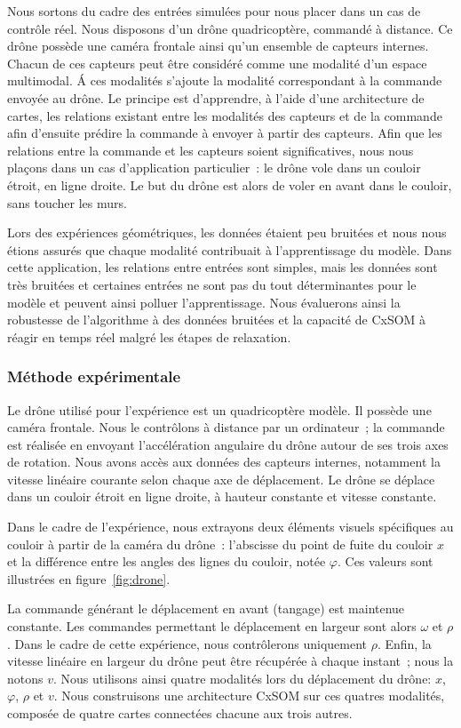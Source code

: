 \documentclass[../main]{subfiles}
\begin{document}
Nous sortons du cadre des entrées simulées pour nous placer dans un cas de contrôle réel.
Nous disposons d'un drône quadricoptère, commandé à distance. 
Ce drône possède une caméra frontale ainsi qu'un ensemble de capteurs internes. Chacun de ces capteurs peut être considéré comme une modalité d'un espace multimodal. \'A ces modalités s'ajoute la modalité correspondant à la commande envoyée au drône.
Le principe est d'apprendre, à l'aide d'une architecture de cartes, les relations existant entre les modalités des capteurs et de la commande afin d'ensuite prédire la commande à envoyer à partir des capteurs.
Afin que les relations entre la commande et les capteurs soient significatives, nous nous plaçons dans un cas d'application particulier~: le drône vole dans un couloir étroit, en ligne droite. Le but du drône est alors de voler en avant dans le couloir, sans toucher les murs.


Lors des expériences géométriques, les données étaient peu bruitées et nous nous étions assurés que chaque modalité contribuait à l'apprentissage du modèle. Dans cette application, les relations entre entrées sont simples, mais les données sont très bruitées et certaines entrées ne sont pas du tout déterminantes pour le modèle et peuvent ainsi polluer l'apprentissage.
Nous évaluerons ainsi la robustesse de l'algorithme à des données bruitées et la capacité de CxSOM à réagir en temps réel malgré les étapes de relaxation.

\subsubsection{Méthode expérimentale}

Le drône utilisé pour l'expérience est un quadricoptère modèle. Il possède une caméra frontale.
Nous le contrôlons à distance par un ordinateur~; la commande est réalisée en envoyant l'accélération angulaire du drône autour de ses trois axes de rotation.
Nous avons accès aux données des capteurs internes, notamment la vitesse linéaire courante selon chaque axe de déplacement. Le drône se déplace dans un couloir étroit en ligne droite, à hauteur constante et vitesse constante.

Dans le cadre de l'expérience, nous extrayons deux éléments visuels spécifiques au couloir à partir de la caméra du drône~: l'abscisse du point de fuite du couloir $x$ et la différence entre les angles des lignes du couloir, notée $\varphi$. Ces valeurs sont illustrées en figure~\ref{fig:drone}.

La commande générant le déplacement en avant (tangage) est maintenue constante. Les commandes permettant le déplacement en largeur sont alors $\omega$ et $\rho$. Dans le cadre de cette expérience, nous contrôlerons uniquement $\rho$.
Enfin, la vitesse linéaire en largeur du drône peut être récupérée à chaque instant~; nous la notons $v$.
Nous utilisons ainsi quatre modalités lors du déplacement du drône: $x$, $\varphi$, $\rho$ et $v$.
Nous construisons une architecture CxSOM sur ces quatres modalités, composée de quatre cartes connectées chacune aux trois autres.
\end{document}

